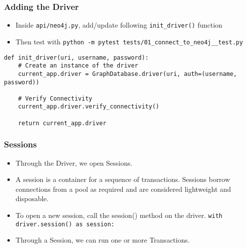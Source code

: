 \begin{frame}[fragile]\frametitle{Adding the Driver}
\begin{itemize}
\item Inside \lstinline|api/neo4j.py|, add/update following \lstinline|init_driver()| function
\item Then test with \lstinline|python -m pytest tests/01_connect_to_neo4j__test.py|
\end{itemize}

\begin{lstlisting}
def init_driver(uri, username, password):
    # Create an instance of the driver
    current_app.driver = GraphDatabase.driver(uri, auth=(username, password))

    # Verify Connectivity
    current_app.driver.verify_connectivity()

    return current_app.driver
\end{lstlisting}

\end{frame}

\begin{frame}[fragile]\frametitle{Sessions}
\begin{itemize}
\item Through the Driver, we open Sessions.
\item A session is a container for a sequence of transactions. Sessions borrow connections from a pool as required and are considered lightweight and disposable.
\item To open a new session, call the session() method on the driver. \lstinline|with driver.session() as session:|
\item Through a Session, we can run one or more Transactions.
\end{itemize}

\end{frame}

